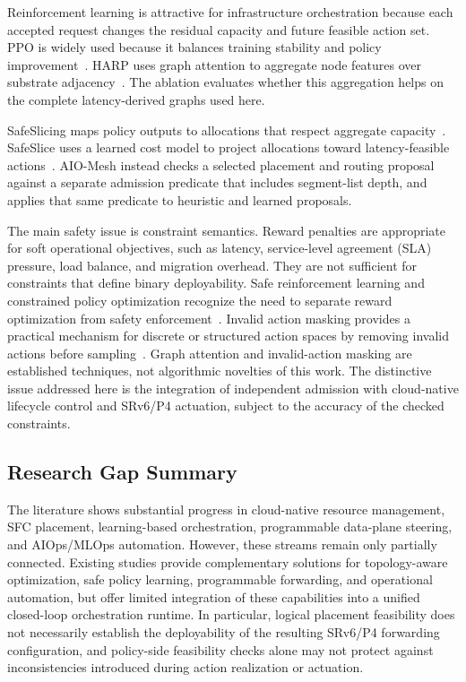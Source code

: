 \documentclass[final,5p]{elsarticle}
\newcommand{\rev}[1]{\textcolor{revisiongreen}{#1}}
\let\newrev\rev
\begin{document}
Reinforcement learning is attractive for infrastructure orchestration because each accepted request changes the residual capacity and future feasible action set. PPO is widely used because it balances training stability and policy improvement~\cite{schulman2017proximal}. \newrev{HARP uses graph attention to aggregate node features over substrate adjacency~\cite{velickovic2018graph}. The ablation evaluates whether this aggregation helps on the complete latency-derived graphs used here.}

\newrev{SafeSlicing maps policy outputs to allocations that respect aggregate capacity~\cite{liu2021safeslicing}. SafeSlice uses a learned cost model to project allocations toward latency-feasible actions~\cite{nagib2025safeslice}. AIO-Mesh instead checks a selected placement and routing proposal against a separate admission predicate that includes segment-list depth, and applies that same predicate to heuristic and learned proposals.}

The main safety issue is constraint semantics. Reward penalties are appropriate for soft operational objectives, such as latency, \rev{service-level agreement (SLA)} pressure, load balance, and migration overhead. They are not sufficient for constraints that define binary deployability. Safe reinforcement learning and constrained policy optimization recognize the need to separate reward optimization from safety enforcement~\cite{gu2024safe,ma2022conservative,wachi2024constraint}. Invalid action masking provides a practical mechanism for discrete or structured action spaces by removing invalid actions before sampling~\cite{huang2022closer}. \newrev{Graph attention and invalid-action masking are established techniques, not algorithmic novelties of this work.} The distinctive issue addressed here is the integration of independent admission with cloud-native lifecycle control and SRv6/P4 actuation, subject to the accuracy of the checked constraints.

\subsection{Research Gap Summary}
\label{subsec:related_gap}
\sloppy
The literature shows substantial progress in cloud-native resource management, SFC placement, learning-based orchestration, programmable data-plane steering, and AIOps/MLOps automation. However, these streams remain only partially connected. \rev{Existing studies provide complementary solutions for topology-aware optimization, safe policy learning, programmable forwarding, and operational automation, but offer limited integration of these capabilities into a unified closed-loop orchestration runtime. In particular, logical placement feasibility does not necessarily establish the deployability of the resulting SRv6/P4 forwarding configuration, and policy-side feasibility checks alone may not protect against inconsistencies introduced during action realization or actuation.}
\end{document}
